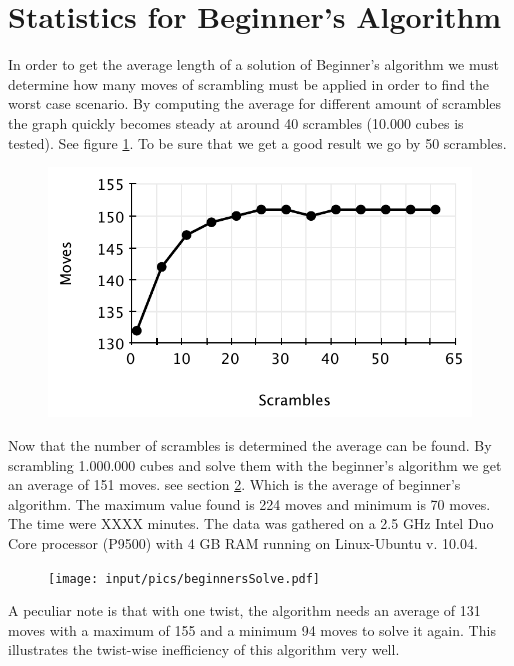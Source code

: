 \section{Statistics for Beginner's Algorithm}
\label{sec:beginnersStat}
In order to get the average length of a solution of Beginner's algorithm we must determine how many moves of scrambling must be applied in order to find the worst case scenario. 
By computing the average for different amount of scrambles the graph quickly becomes steady at around 40 scrambles (10.000 cubes is tested). See figure \ref{fig:beginnersScramble}. To be sure that we get a good result we go by 50 scrambles.
\begin{figure}[htbp]
	\centering
		\includegraphics{input/pics/beginnersScramble.pdf}
	\caption{}
	\label{fig:beginnersScramble}
\end{figure}

Now that the number of scrambles is determined the average can be found.
By scrambling 1.000.000 cubes and solve them with the beginner's algorithm we get an average of 151 moves. 
see section \ref{fig:beginnersSolve}. 
Which is the average of beginner's algorithm. 
The maximum value found is 224 moves and minimum is 70 moves. The time were XXXX minutes. 
The data was gathered on a 2.5 GHz Intel Duo Core processor (P9500) with 4 GB RAM running on Linux-Ubuntu v. 10.04.
\begin{figure}[htbp]
	\centering
		\texttt{[image: input/pics/beginnersSolve.pdf]}
	\caption{}
	\label{fig:beginnersSolve}
\end{figure}

A peculiar note is that with one twist, the algorithm needs an average of 131 moves with a maximum of 155 and a minimum 94 moves to solve it again.
This illustrates the twist-wise inefficiency of this algorithm very well.


